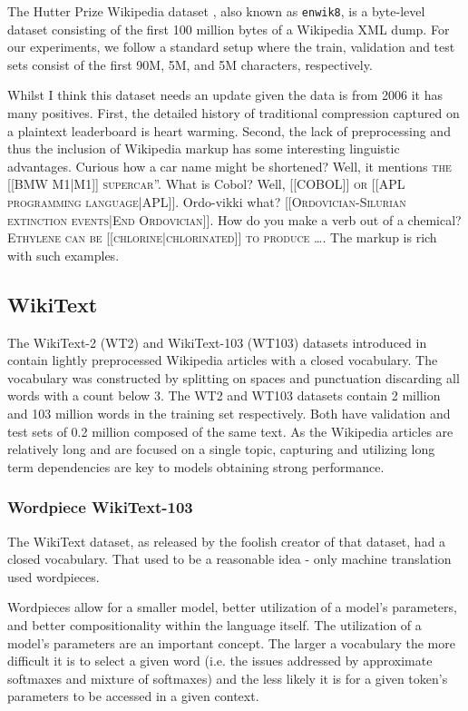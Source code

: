 \documentclass{article}
\newcommand{\enwik}{\texttt{enwik8}\xspace}
\begin{document}
The Hutter Prize Wikipedia dataset \cite{hutter}, also known as \enwik, is a byte-level dataset consisting of the first 100 million bytes of a Wikipedia XML dump.
For our experiments, we follow a standard setup where the train, validation and test sets consist of the first 90M, 5M, and 5M characters, respectively.

Whilst I think this dataset needs an update given the data is from 2006 it has many positives.
First, the detailed history of traditional compression captured on a plaintext leaderboard is heart warming.
Second, the lack of preprocessing and thus the inclusion of Wikipedia markup has some interesting linguistic advantages.
Curious how a car name might be shortened?
Well, it mentions \textsc{the [[BMW M1|M1]] supercar}''.
What is Cobol? Well, \textsc{[[COBOL]] or [[APL programming language|APL]]}.
Ordo-vikki what? \textsc{[[Ordovician-Silurian extinction events|End Ordovician]]}.
How do you make a verb out of a chemical? \textsc{Ethylene can be [[chlorine|chlorinated]] to produce \ldots}.
The markup is rich with such examples.

\subsection{WikiText}
The WikiText-2 (WT2) and WikiText-103 (WT103) datasets introduced in \citet{Merity2016} contain lightly preprocessed Wikipedia articles with a closed vocabulary.
The vocabulary was constructed by splitting on spaces and punctuation  discarding all words with a count below 3.
The WT2 and WT103 datasets contain 2 million and 103 million words in the training set respectively.
Both have validation and test sets of 0.2 million composed of the same text.
As the Wikipedia articles are relatively long and are focused on a single topic, capturing and utilizing long term dependencies are key to models obtaining strong performance. 

\subsubsection{Wordpiece WikiText-103}

The WikiText dataset, as released by the foolish creator of that dataset, had a closed vocabulary.
That used to be a reasonable idea - only machine translation used wordpieces.

Wordpieces allow for a smaller model, better utilization of a model's parameters, and better compositionality within the language itself.
The utilization of a model's parameters are an important concept.
The larger a vocabulary the more difficult it is to select a given word (i.e. the issues addressed by approximate softmaxes and mixture of softmaxes) and the less likely it is for a given token's parameters to be accessed in a given context.
\end{document}

